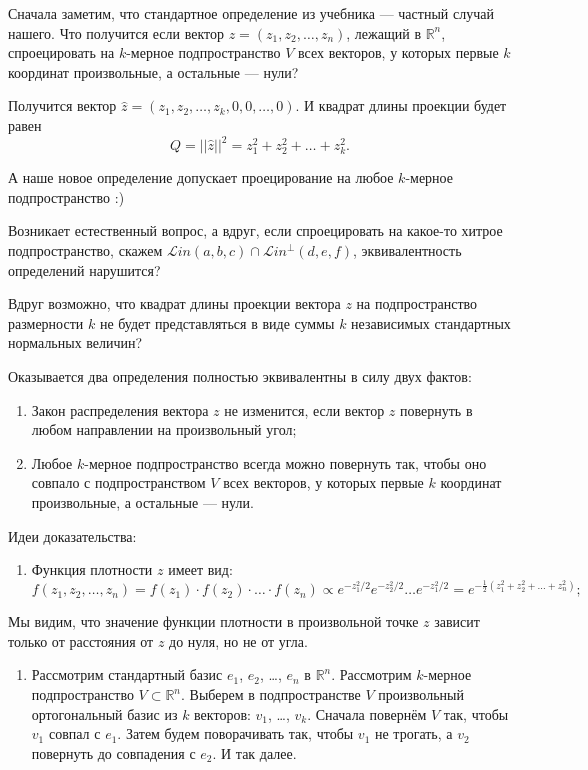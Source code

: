 \documentclass[11pt,russian,]{article}
\providecommand{\tightlist}{%
  \setlength{\itemsep}{0pt}\setlength{\parskip}{0pt}}
\newcommand{\RR}{\mathbb{R}}
\renewcommand{\Rn}{\RR^n}
\newcommand{\1}{\mathbbm{1}}
\newcommand{\Lin}{\mathcal{L}in}
\newcommand{\Linp}{\Lin^{\perp}}
\begin{document}
Сначала заметим, что стандартное определение из учебника --- частный
случай нашего. Что получится если вектор
\(z = (z_1, z_2, \ldots, z_n)\), лежащий в \(\Rn\), спроецировать на
\(k\)-мерное подпространство \(V\) всех векторов, у которых первые \(k\)
координат произвольные, а остальные --- нули?

Получится вектор \(\hat z = (z_1, z_2, \ldots, z_k, 0, 0, \ldots, 0)\).
И квадрат длины проекции будет равен \[
Q = ||\hat z||^2 = z_1^2 + z_2^2 + \ldots + z_k^2.
\]

А наше новое определение допускает проецирование на любое \(k\)-мерное
подпространство :)

Возникает естественный вопрос, а вдруг, если спроецировать на какое-то
хитрое подпространство, скажем \(\Lin(a, b, c) \cap \Linp (d, e, f)\),
эквивалентность определений нарушится?

Вдруг возможно, что квадрат длины проекции вектора \(z\) на
подпространство размерности \(k\) не будет представляться в виде суммы
\(k\) независимых стандартных нормальных величин?

Оказывается два определения полностью эквивалентны в силу двух фактов:

\begin{enumerate}
\def\labelenumi{\arabic{enumi}.}
\item
  Закон распределения вектора \(z\) не изменится, если вектор \(z\)
  повернуть в любом направлении на произвольный угол;
\item
  Любое \(k\)-мерное подпространство всегда можно повернуть так, чтобы
  оно совпало с подпространством \(V\) всех векторов, у которых первые
  \(k\) координат произвольные, а остальные --- нули.
\end{enumerate}

Идеи доказательства:

\begin{enumerate}
\def\labelenumi{\arabic{enumi}.}
\tightlist
\item
  Функция плотности \(z\) имеет вид: \[
  f(z_1, z_2, \ldots, z_n) = f(z_1) \cdot f(z_2)\cdot \ldots \cdot f(z_n) \propto e^{-z_1^2/2}e^{-z_2^2/2}\ldots e^{-z_1^2/2} = e^{-\frac{1}{2}(z_1^2 + z_2^2 +\ldots +z_n^2)};
  \]
\end{enumerate}

Мы видим, что значение функции плотности в произвольной точке \(z\)
зависит только от расстояния от \(z\) до нуля, но не от угла.

\begin{enumerate}
\def\labelenumi{\arabic{enumi}.}
\setcounter{enumi}{1}
\tightlist
\item
  Рассмотрим стандартный базис \(e_1\), \(e_2\), \ldots, \(e_n\) в
  \(\Rn\). Рассмотрим \(k\)-мерное подпространство \(V \subset \Rn\).
  Выберем в подпространстве \(V\) произвольный ортогональный базис из
  \(k\) векторов: \(v_1\), \ldots, \(v_k\). Сначала повернём \(V\) так,
  чтобы \(v_1\) совпал с \(e_1\). Затем будем поворачивать так, чтобы
  \(v_1\) не трогать, а \(v_2\) повернуть до совпадения с \(e_2\). И так
  далее.
\end{enumerate}
\end{document}
